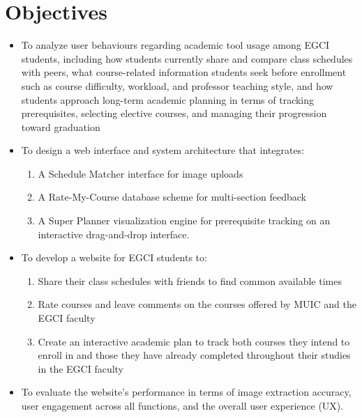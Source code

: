 \section{Objectives}
\begin{itemize}
	\item To analyze user behaviours regarding academic tool usage among EGCI students, including how students currently share and compare class schedules with peers, what course-related information students seek before enrollment such as course difficulty, workload, and professor teaching style, and how students approach long-term academic planning in terms of tracking prerequisites, selecting elective courses, and managing their progression toward graduation
	\item To design a web interface and system architecture that integrates:
	\begin{enumerate}[label=\alph*.]
	\item A Schedule Matcher interface for image uploads
	\item A Rate-My-Course database scheme for multi-section feedback
	\item A Super Planner visualization engine for prerequisite tracking on an interactive drag-and-drop interface.
	\end{enumerate}
	\item To develop a website for EGCI students to:
	\begin{enumerate}[label=\alph*.]
	\item Share their class schedules with friends to find common available times
	\item Rate courses and leave comments on the courses offered by MUIC and the EGCI faculty
	\item Create an interactive academic plan to track both courses they intend to enroll in and those they have already completed throughout their studies in the EGCI faculty
	\end{enumerate}
	\item To evaluate the website’s performance in terms of image extraction accuracy, user engagement across all functions, and the overall user experience (UX).
	
\end{itemize}


